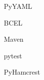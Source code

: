 \begin{thebibliography}{1}
\begin{flushleft}
PyYAML
\end{flushleft}

\begin{flushleft}
BCEL
\end{flushleft}

\begin{flushleft}
Maven
\end{flushleft}

\begin{flushleft}
pytest
\end{flushleft}

\begin{flushleft}
PyHamcrest
\end{flushleft}

\end{thebibliography}
